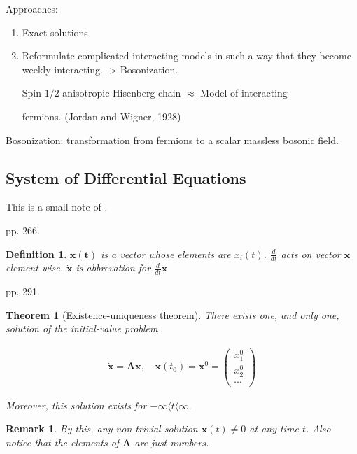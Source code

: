 \documentclass{article}
\numberwithin{equation}{subsection} %
\newtheorem{defi}{Definition}[section]
\newtheorem{thm}{Theorem}[section]
\newtheorem{remark}{Remark}[section]
\theoremstyle{definition}
\begin{document}
    Approaches:
    \begin{enumerate}
            \item Exact solutions
            \item Reformulate complicated interacting models in such a way
                    that they become weekly interacting. -> Bosonization.
                    
                    Spin $1/2$ anisotropic Hisenberg chain $\approx$
                    Model of interacting

                    fermions.
                    (Jordan and Wigner, 1928)
    \end{enumerate}
    Bosonization: transformation from fermions to a scalar massless bosonic
    field.


    \subsection{System of Differential Equations}
    This is a small note of \cite{DETA}.

    pp. 266.

    \begin{defi}
        $\mathbf{x(t)}$ is a vector whose elements are $x_i(t)$.
        $ \frac{d}{d t}$ acts on vector $\mathbf{x}$ element-wise.
        $\dot{\mathbf{x}}$ is abbrevation for $\frac{d}{d t}\mathbf{x}$
    \end{defi}
    
    pp. 291.

    \begin{thm}[Existence-uniqueness theorem]
        There exists one, and only one, solution of the initial-value
        problem

        \begin{align}
            \dot{\mathbf{x}}=\mathbf{A}\mathbf{x}\text{, }&
                \mathbf{x}(t_0) = \mathbf{x}^0 = 
                \left(
                \begin{array}{c}
		            x^0_1\\
                    x^0_2\\
                    \cdots
                \end{array} 
                    \right)
        \end{align}
        
        Moreover, this solution exists for $-\infty\langle t\langle \infty$.
    \end{thm}
    \begin{remark}
        By this, any non-trivial solution $\mathbf{x}(t)\neq 0$ at any
        time $t$. Also notice that the elements of $\mathbf{A}$ are just
        numbers.
    \end{remark}
    
\end{document}
